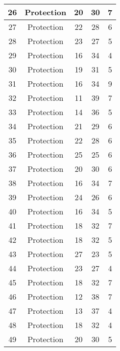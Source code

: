\documentclass[results.tex]{subfiles}
\begin{document}
\begin{center}
\begin{tabular}{| c || c | c | c | c |}
    \hline
    26 & Protection & 20 & 30 & 7 \\ 
    \hline
    27 & Protection & 22 & 28 & 6 \\ 
    \hline
    28 & Protection & 23 & 27 & 5 \\ 
    \hline
    29 & Protection & 16 & 34 & 4 \\ 
    \hline
    30 & Protection & 19 & 31 & 5 \\ 
    \hline
    31 & Protection & 16 & 34 & 9 \\ 
    \hline
    32 & Protection & 11 & 39 & 7 \\ 
    \hline
    33 & Protection & 14 & 36 & 5 \\ 
    \hline
    34 & Protection & 21 & 29 & 6 \\ 
    \hline
    35 & Protection & 22 & 28 & 6 \\ 
    \hline
    36 & Protection & 25 & 25 & 6 \\ 
    \hline
    37 & Protection & 20 & 30 & 6 \\ 
    \hline
    38 & Protection & 16 & 34 & 7 \\ 
    \hline
    39 & Protection & 24 & 26 & 6 \\ 
    \hline
    40 & Protection & 16 & 34 & 5 \\ 
    \hline
    41 & Protection & 18 & 32 & 7 \\ 
    \hline
    42 & Protection & 18 & 32 & 5 \\ 
    \hline
    43 & Protection & 27 & 23 & 5 \\ 
    \hline
    44 & Protection & 23 & 27 & 4 \\ 
    \hline
    45 & Protection & 18 & 32 & 7 \\ 
    \hline
    46 & Protection & 12 & 38 & 7 \\ 
    \hline
    47 & Protection & 13 & 37 & 4 \\ 
    \hline
    48 & Protection & 18 & 32 & 4 \\ 
    \hline
    49 & Protection & 20 & 30 & 5 \\ 
    \hline   \end{tabular}
\end{center}
\end{document}
